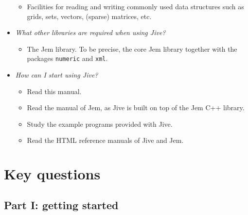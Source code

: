\documentclass[a4paper,12pt]{article}
\begin{document}
\begin{itemize}
\begin{itemize}
  \item Facilities for reading and writing commonly used data
    structures such as grids, sets, vectors, (sparse) matrices, etc.

  \end{itemize}


\item \emph{What other libraries are required when using Jive?}

  \begin{itemize}

  \item The Jem library. To be precise, the core Jem library together
    with the packages \texttt{numeric} and \texttt{xml}.

  \end{itemize}


\item \emph{How can I start using Jive?}

  \begin{itemize}

  \item Read this manual.
    
  \item Read the manual of Jem, as Jive is built on top of the Jem C++
    library.

  \item Study the example programs provided with Jive.

  \item Read the HTML reference manuals of Jive and Jem.

  \end{itemize}

\end{itemize}



\section{Key questions}

\subsection*{Part I: getting started}
\end{document}
